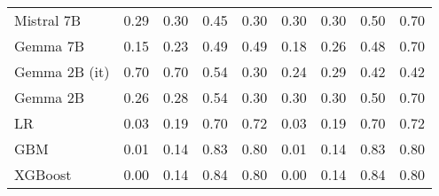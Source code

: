 \begin{tabular}{lllllllll}
Mistral 7B & 0.29 & 0.30 & \cellcolor{orange!25.0} 0.45 & \cellcolor{orange!25.0} 0.30 & \cellcolor{orange!22.1} 0.30 & \cellcolor{orange!18.5} 0.30 & 0.50 & 0.70 \\
Gemma 7B & 0.15 & \cellcolor{cyan!3.4} 0.23 & 0.49 & 0.49 & 0.18 & 0.26 & 0.48 & 0.70 \\
Gemma 2B (it) & \cellcolor{orange!25.0} 0.70 & \cellcolor{orange!25.0} 0.70 & 0.54 & \cellcolor{orange!25.0} 0.30 & 0.24 & \cellcolor{orange!14.2} 0.29 & \cellcolor{orange!25.0} 0.42 & 0.42 \\
Gemma 2B & 0.26 & 0.28 & 0.54 & \cellcolor{orange!25.0} 0.30 & \cellcolor{orange!25.0} 0.30 & \cellcolor{orange!25.0} 0.30 & 0.50 & 0.70 \\
LR & 0.03 & 0.19 & 0.70 & 0.72 & 0.03 & 0.19 & 0.70 & 0.72 \\
GBM & 0.01 & 0.14 & 0.83 & 0.80 & 0.01 & 0.14 & 0.83 & 0.80 \\
XGBoost & 0.00 & 0.14 & 0.84 & 0.80 & 0.00 & 0.14 & 0.84 & 0.80 \\
\bottomrule
\end{tabular}

